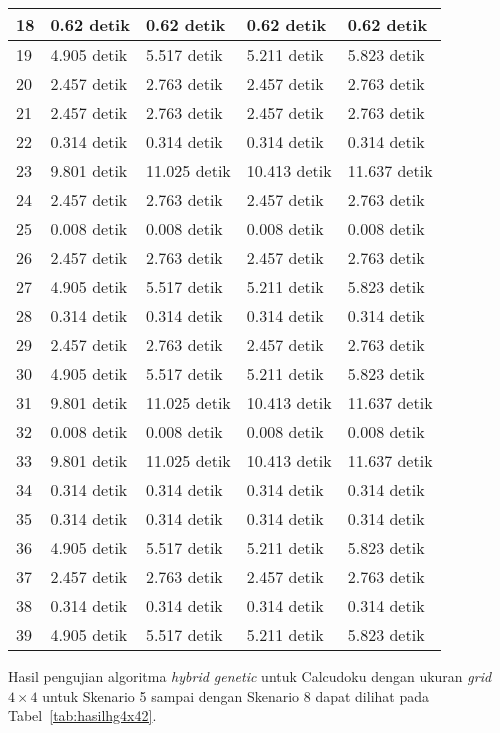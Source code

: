 \begin{table}
\begin{tabular}{| l | l | l | l | l |}
\hline
18 & 0.62 detik & 0.62 detik & 0.62 detik & 0.62 detik \\
\hline
19 & 4.905 detik & 5.517 detik & 5.211 detik & 5.823 detik \\
\hline
20 & 2.457 detik & 2.763 detik & 2.457 detik & 2.763 detik \\
\hline
21 & 2.457 detik & 2.763 detik & 2.457 detik & 2.763 detik \\
\hline
22 & 0.314 detik & 0.314 detik & 0.314 detik & 0.314 detik \\
\hline
23 & 9.801 detik & 11.025 detik & 10.413 detik & 11.637 detik \\
\hline
24 & 2.457 detik & 2.763 detik & 2.457 detik & 2.763 detik \\
\hline
25 & 0.008 detik & 0.008 detik & 0.008 detik & 0.008 detik \\
\hline
26 & 2.457 detik & 2.763 detik & 2.457 detik & 2.763 detik \\
\hline
27 & 4.905 detik & 5.517 detik & 5.211 detik & 5.823 detik \\
\hline
28 & 0.314 detik & 0.314 detik & 0.314 detik & 0.314 detik \\
\hline
29 & 2.457 detik & 2.763 detik & 2.457 detik & 2.763 detik \\
\hline
30 & 4.905 detik & 5.517 detik & 5.211 detik & 5.823 detik \\
\hline
31 & 9.801 detik & 11.025 detik & 10.413 detik & 11.637 detik \\
\hline
32 & 0.008 detik & 0.008 detik & 0.008 detik & 0.008 detik \\
\hline
33 & 9.801 detik & 11.025 detik & 10.413 detik & 11.637 detik \\
\hline
34 & 0.314 detik & 0.314 detik & 0.314 detik & 0.314 detik \\
\hline
35 & 0.314 detik & 0.314 detik & 0.314 detik & 0.314 detik \\
\hline
36 & 4.905 detik & 5.517 detik & 5.211 detik & 5.823 detik \\
\hline
37 & 2.457 detik & 2.763 detik & 2.457 detik & 2.763 detik \\
\hline
38 & 0.314 detik & 0.314 detik & 0.314 detik & 0.314 detik \\
\hline
39 & 4.905 detik & 5.517 detik & 5.211 detik & 5.823 detik \\
\hline
\end{tabular}
\label{tab:hasilhg4x41}
\end{table}

Hasil pengujian algoritma \textit{hybrid genetic} untuk Calcudoku dengan ukuran \textit{grid} \begin{math}4 \times 4\end{math} untuk Skenario 5 sampai dengan Skenario 8 dapat dilihat pada Tabel~\ref{tab:hasilhg4x42}.

